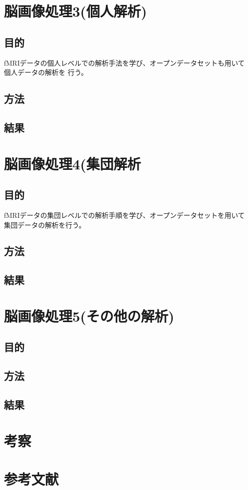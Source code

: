 \documentclass{jlreq}
\begin{document}
\section{脳画像処理3(個人解析)}
\subsection{目的}
fMRIデータの個人レベルでの解析手法を学び、オープンデータセットも用いて個人データの解析を
行う。
\subsection{方法}

\subsection{結果}

\section{脳画像処理4(集団解析}
\subsection{目的}
fMRIデータの集団レベルでの解析手順を学び、オープンデータセットを用いて集団データの解析を行う。

\subsection{方法}

\subsection{結果}

\section{脳画像処理5(その他の解析)}
\subsection{目的}

\subsection{方法}

\subsection{結果}



\section{考察}



\section*{参考文献}
\end{document}
